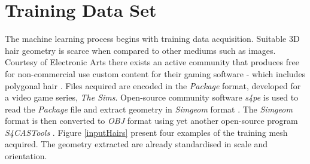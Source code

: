 \documentclass[ %
author={Dillon Keith Diep},
supervisor={Dr. Carl Henrik Ek},
degree={MEng},
title={ART-CG Hair:},
subtitle={Assisted Real-time Content Generation of Stylised Virtual Hair},
type={Research},
year={2017} ]{dissertation}
\begin{document}
\section{Training Data Set}
The machine learning process begins with training data acquisition. Suitable 3D hair geometry is scarce when compared to other mediums such as images. Courtesy of Electronic Arts there exists an active community that produces free for non-commercial use custom content for their gaming software - which includes polygonal hair \cite{tsr}. Files acquired are encoded in the \textit{Package} format, developed for a video game series, \textit{The Sims}. Open-source community software \textit{s4pe} is used to read the \textit{Package} file and extract geometry in \textit{Simgeom} format \cite{s4pe}. The \textit{Simgeom} format is then converted to \textit{OBJ} format using yet another open-source program \textit{S4CASTools} \cite{s4cas}. Figure \ref{inputHairs} present four examples of the training mesh acquired. The geometry extracted are already standardised in scale and orientation.
\end{document}
